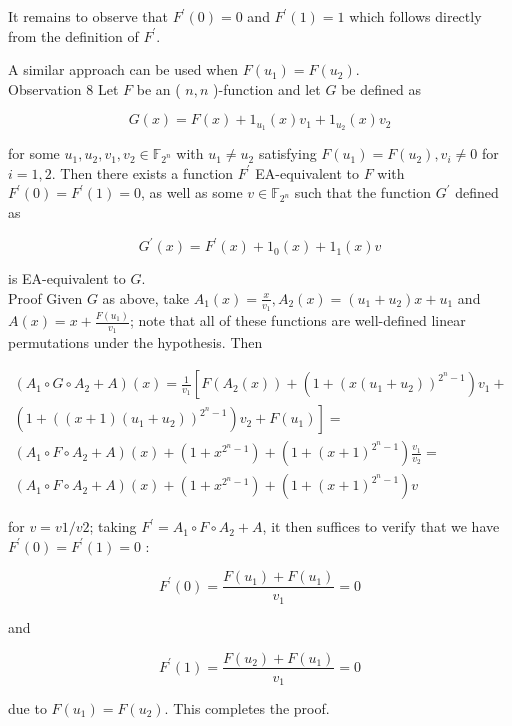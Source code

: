 \documentclass[10pt]{article}
\begin{document}
It remains to observe that $F^{\prime}(0)=0$ and $F^{\prime}(1)=1$ which follows directly from the definition of $F^{\prime}$.

A similar approach can be used when $F\left(u_{1}\right)=F\left(u_{2}\right)$.\\
Observation 8 Let $F$ be an ( $n, n$ )-function and let $G$ be defined as

$$
G(x)=F(x)+1_{u_{1}}(x) v_{1}+1_{u_{2}}(x) v_{2}
$$

for some $u_{1}, u_{2}, v_{1}, v_{2} \in \mathbb{F}_{2^{n}}$ with $u_{1} \neq u_{2}$ satisfying $F\left(u_{1}\right)=F\left(u_{2}\right), v_{i} \neq 0$ for $i=1,2$. Then there exists a function $F^{\prime}$ EA-equivalent to $F$ with $F^{\prime}(0)=F^{\prime}(1)=0$, as well as some $v \in \mathbb{F}_{2^{n}}$ such that the function $G^{\prime}$ defined as

$$
G^{\prime}(x)=F^{\prime}(x)+1_{0}(x)+1_{1}(x) v
$$

is EA-equivalent to $G$.\\
Proof Given $G$ as above, take $A_{1}(x)=\frac{x}{v_{1}}, A_{2}(x)=\left(u_{1}+u_{2}\right) x+u_{1}$ and $A(x)=x+\frac{F\left(u_{1}\right)}{v_{1}}$; note that all of these functions are well-defined linear permutations under the hypothesis. Then


\begin{gather*}
\left(A_{1} \circ G \circ A_{2}+A\right)(x)=\frac{1}{v_{1}}\left[F\left(A_{2}(x)\right)+\left(1+\left(x\left(u_{1}+u_{2}\right)\right)^{2^{n}-1}\right) v_{1}+\right. \\
\left.\left(1+\left((x+1)\left(u_{1}+u_{2}\right)\right)^{2^{n}-1}\right) v_{2}+F\left(u_{1}\right)\right]= \\
\left(A_{1} \circ F \circ A_{2}+A\right)(x)+\left(1+x^{2^{n}-1}\right)+\left(1+(x+1)^{2^{n}-1}\right) \frac{v_{1}}{v_{2}}=  \tag{11}\\
\left(A_{1} \circ F \circ A_{2}+A\right)(x)+\left(1+x^{2^{n}-1}\right)+\left(1+(x+1)^{2^{n}-1}\right) v
\end{gather*}


for $v=v 1 / v 2$; taking $F^{\prime}=A_{1} \circ F \circ A_{2}+A$, it then suffices to verify that we have $F^{\prime}(0)=F^{\prime}(1)=0$ :

$$
F^{\prime}(0)=\frac{F\left(u_{1}\right)+F\left(u_{1}\right)}{v_{1}}=0
$$

and

$$
F^{\prime}(1)=\frac{F\left(u_{2}\right)+F\left(u_{1}\right)}{v_{1}}=0
$$

due to $F\left(u_{1}\right)=F\left(u_{2}\right)$. This completes the proof.
\end{document}
